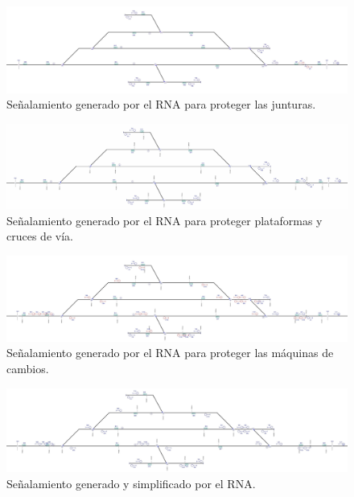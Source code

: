     \begin{figure}[h]
        \centering
        \includegraphics[width=1\textwidth]{resultados-obtenidos/ejemplo4/images/4_step2.png}
        \centering\caption{Señalamiento generado por el RNA para proteger las junturas.}
    \end{figure}

    \begin{figure}[h]
        \centering
        \includegraphics[width=1\textwidth]{resultados-obtenidos/ejemplo4/images/4_step3.png}
        \centering\caption{Señalamiento generado por el RNA para proteger plataformas y cruces de vía.}
    \end{figure}

    \begin{figure}[h]
        \centering
        \includegraphics[width=1\textwidth]{resultados-obtenidos/ejemplo4/images/4_step4.png}
        \centering\caption{Señalamiento generado por el RNA para proteger las máquinas de cambios.}
    \end{figure}

    \begin{figure}[h]
        \centering
        \includegraphics[width=1\textwidth]{resultados-obtenidos/ejemplo4/images/4_RNA.png}
        \centering\caption{Señalamiento generado y simplificado por el RNA.}
    \end{figure}

    
    
    
    